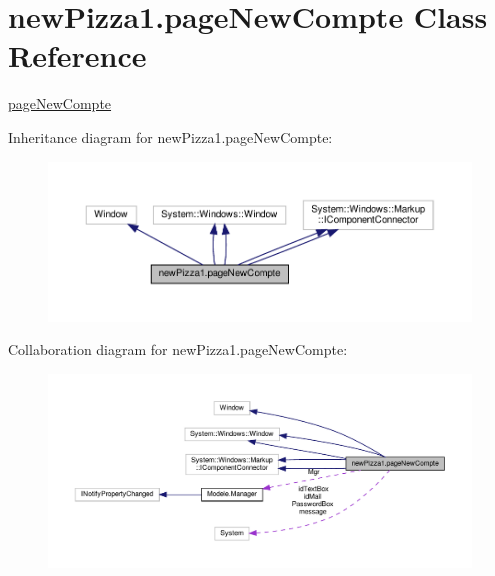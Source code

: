 \hypertarget{classnewPizza1_1_1pageNewCompte}{}\section{new\+Pizza1.\+page\+New\+Compte Class Reference}
\label{classnewPizza1_1_1pageNewCompte}


\hyperlink{classnewPizza1_1_1pageNewCompte}{page\+New\+Compte}  




Inheritance diagram for new\+Pizza1.\+page\+New\+Compte\+:
\nopagebreak
\begin{figure}[H]
\begin{center}
\leavevmode
\includegraphics[width=350pt]{classnewPizza1_1_1pageNewCompte__inherit__graph}
\end{center}
\end{figure}


Collaboration diagram for new\+Pizza1.\+page\+New\+Compte\+:
\nopagebreak
\begin{figure}[H]
\begin{center}
\leavevmode
\includegraphics[width=350pt]{classnewPizza1_1_1pageNewCompte__coll__graph}
\end{center}
\end{figure}
